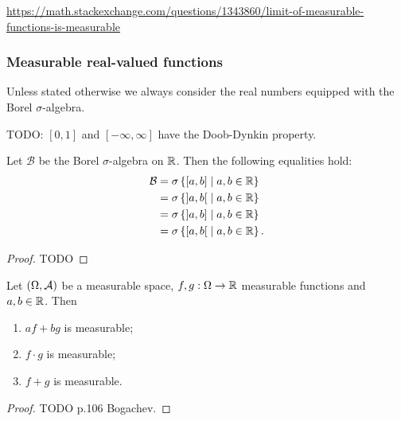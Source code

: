 \url{https://math.stackexchange.com/questions/1343860/limit-of-measurable-functions-is-measurable}


\subsubsection{Measurable real-valued functions}
Unless stated otherwise we always consider the real numbers equipped with the Borel $\sigma$-algebra.

\begin{proposition}
TODO: $[0,1]$ and $[-\infty,\infty]$ have the Doob-Dynkin property.
\end{proposition}

\begin{proposition}
Let $\mathcal{B}$ be the Borel $\sigma$-algebra on $\mathbb{R}$. Then the following equalities hold:
\begin{align*}
\mathcal{B} &= \sigma\setbuilder{\interval[c]{a,b}}{a,b\in \R} \\
&= \sigma\setbuilder{\interval[o]{a,b}}{a,b\in \R} \\
&= \sigma\setbuilder{\interval[oc]{a,b}}{a,b\in \R} \\
&= \sigma\setbuilder{\interval[co]{a,b}}{a,b\in \R}.
\end{align*}
\end{proposition}
\begin{proof}
TODO
\end{proof}

\begin{proposition} \label{operationsOnRealMeasurableFunctions}
Let $\left( \Omega, \mathcal{A} \right)$ be a measurable space, $f,g: \Omega \to \mathbb{R}$ measurable functions and $a,b\in \mathbb{R}$. Then
\begin{enumerate}
\item $af +bg$ is measurable;
\item $f\cdot g$ is measurable;
\item $f+g$ is measurable.
\end{enumerate}
\end{proposition}
\begin{proof}
TODO p.106 Bogachev.
\end{proof}

